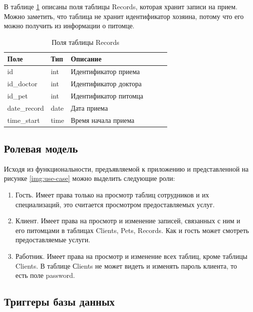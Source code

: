 В таблице \ref{tab:records}  описаны поля таблицы Records, которая хранит записи на прием. Можно заметить, что таблица не хранит идентификатор хозяина, потому что его можно получить из информации о питомце. 

\begin{table}[hbtp]
		\captionsetup{justification=raggedright, singlelinecheck=false}
		\caption{\label{tab:records}Поля таблицы Records}
	\begin{center}
		\begin{tabular}{|l|l|l|l|l|l|}
			\hline {Поле} & {Тип} & {Описание}  \\ \hline
			id  & int & Идентификатор приема   \\ \hline
			id\_doctor & int & Идентификатор доктора  \\ \hline
			id\_pet & int & Идентификатор питомца   \\ \hline
			date\_record & date & Дата приема \\ \hline
			time\_start & time & Время начала приема  \\ \hline
		\end{tabular}
	\end{center}
\end{table}

\pagebreak

\subsection{Ролевая модель}
Исходя из функциональности, предъявляемой к приложению и представленной на рисунке \ref{img:use-case} можно выделить следующие роли:
\begin{enumerate}[label=\arabic*)]
	\item Гость. Имеет права только на просмотр таблиц сотрудников и их специализаций, это считается просмотром предоставляемых услуг.
	\item Клиент. Имеет права на просмотр и изменение записей, связанных с ним и его питомцами в таблицах Clients, Pets, Records. Как и гость может смотреть предоставляемые услуги.
	\item Работник. Имеет права на просмотр и изменение всех таблиц, кроме таблицы Clients. В таблице Сlients не может видеть и изменять пароль клиента, то есть поле password.  
\end{enumerate}

\subsection{Триггеры базы данных}

